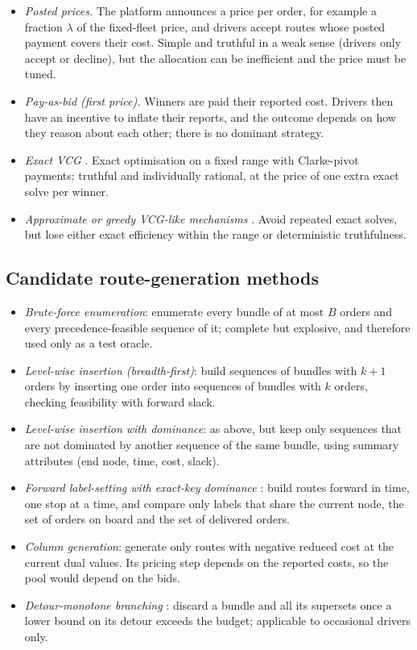 \begin{itemize}[leftmargin=*,itemsep=3pt]
\item \emph{Posted prices.} The platform announces a price per order,
for example a fraction $\lambda$ of the fixed-fleet price, and drivers
accept routes whose posted payment covers their cost. Simple and
truthful in a weak sense (drivers only accept or decline), but the
allocation can be inefficient and the price must be tuned.
\item \emph{Pay-as-bid (first price).} Winners are paid their reported cost.
Drivers then have an incentive to inflate their reports, and the outcome
depends on how they reason about each other; there is no dominant strategy.
\item \emph{Exact VCG} \citep{zou2022mechanisms,li2026auction}. Exact
optimisation on a fixed range with Clarke-pivot payments; truthful and
individually rational, at the price of one extra exact solve per winner.
\item \emph{Approximate or greedy VCG-like mechanisms}
\citep{li2026auction,wilkens2012single}. Avoid repeated exact solves, but
lose either exact efficiency within the range or deterministic truthfulness.
\end{itemize}

\subsection{Candidate route-generation methods}

\begin{itemize}[leftmargin=*,itemsep=3pt]
\item \emph{Brute-force enumeration}: enumerate every bundle of at most $B$
orders and every precedence-feasible sequence of it; complete but
explosive, and therefore used only as a test oracle.
\item \emph{Level-wise insertion (breadth-first)}: build sequences of
bundles with $k+1$ orders by inserting one order into sequences of bundles
with $k$ orders, checking feasibility with forward slack.
\item \emph{Level-wise insertion with dominance}: as above, but keep only
sequences that are not dominated by another sequence of the same bundle,
using summary attributes (end node, time, cost, slack).
\item \emph{Forward label-setting with exact-key dominance}
\citep{dumas1991pickup,gschwind2018bidirectional}: build routes forward in
time, one stop at a time, and compare only labels that share the current
node, the set of orders on board and the set of delivered orders.
\item \emph{Column generation}: generate only routes with negative reduced
cost at the current dual values. Its pricing step depends on the reported
costs, so the pool would depend on the bids.
\item \emph{Detour-monotone branching} \citep{li2026auction}: discard a
bundle and all its supersets once a lower bound on its detour exceeds the
budget; applicable to occasional drivers only.
\end{itemize}

